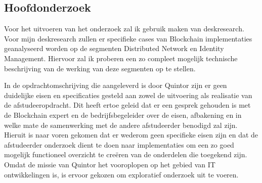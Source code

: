 \subsection{Hoofdonderzoek}

Voor het uitvoeren van het onderzoek zal ik gebruik maken van deskresearch. Voor mijn deskresearch zullen er specifieke cases van Blockchain implementaties geanalyseerd worden op de segmenten Distributed Network en Identity Management. Hiervoor zal ik proberen een zo compleet mogelijk technische beschrijving van de werking van deze segmenten op te stellen.

In de opdrachtomschrijving die aangeleverd is door Quintor zijn er geen duidelijke eisen en specificaties gesteld aan zowel de uitvoering als realisatie van de afstudeeropdracht. Dit heeft ertoe geleid dat er een gesprek gehouden is met de Blockchain expert en de bedrijfsbegeleider over de eisen, afbakening en in welke mate de samenwerking met de andere afstudeerder benodigd zal zijn. Hieruit is naar voren gekomen dat er wederom geen specifieke eisen zijn en dat de afstudeerder onderzoek dient te doen naar implementaties om een zo goed mogelijk functioneel overzicht te creëren van de onderdelen die toegekend zijn. Omdat de missie van Quintor het vooroplopen op het gebied van IT ontwikkelingen is, is ervoor gekozen om exploratief onderzoek uit te voeren.